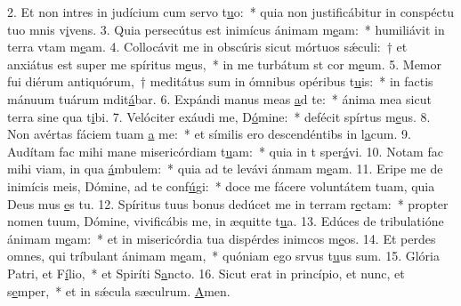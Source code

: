 2. Et non intres in judícium cum servo t\uline{u}o:~* quia non justificábitur in conspéctu tuo mnis v\uline{i}vens.
3. Quia persecútus est inimícus ánimam m\uline{e}am:~* humiliávit in terra vtam m\uline{e}am.
4. Collocávit me in obscúris sicut mórtuos sǽculi:~† et anxiátus est super me spíritus m\uline{e}us,~* in me turbátum st cor m\uline{e}um.
5. Memor fui diérum antiquórum,~† meditátus sum in ómnibus opéribus t\uline{u}is:~* in factis mánuum tuárum mdit\uline{á}bar.
6. Expándi manus meas \uline{a}d te:~* ánima mea sicut terra sine qua t\uline{i}bi.
7. Velóciter exáudi me, D\uline{ó}mine:~* defécit spírtus m\uline{e}us.
8. Non avértas fáciem tuam \uline{a} me:~* et símilis ero descendéntibs in l\uline{a}cum.
9. Audítam fac mihi mane misericórdiam t\uline{u}am:~* quia in t sper\uline{á}vi.
10. Notam fac mihi viam, in qua \uline{á}mbulem:~* quia ad te levávi ánmam m\uline{e}am.
11. Eripe me de inimícis meis, Dómine, ad te conf\uline{ú}gi:~* doce me fácere voluntátem tuam, quia Deus mus \uline{e}s tu.
12. Spíritus tuus bonus dedúcet me in terram r\uline{e}ctam:~* propter nomen tuum, Dómine, vivificábis me, in æquitte t\uline{u}a.
13. Edúces de tribulatióne ánimam m\uline{e}am:~* et in misericórdia tua dispérdes inimcos m\uline{e}os.
14. Et perdes omnes, qui tríbulant ánimam m\uline{e}am,~* quóniam ego srvus t\uline{u}us sum.
15. Glória Patri, et F\uline{í}lio,~* et Spiríti S\uline{a}ncto.
16. Sicut erat in princípio, et nunc, et s\uline{e}mper,~* et in sǽcula sæculrum. \uline{A}men.
